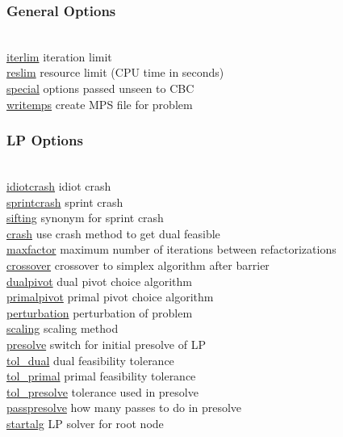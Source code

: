 
\subsubsection{General Options}
\begin{tabbing}
\hspace {1.3in} \= \\
\hyperlink{iterlim}
{iterlim} \> iteration limit \\
\hyperlink{reslim}
{reslim} \> resource limit (CPU time in seconds)\\
\hyperlink{special}
{special} \> options passed unseen to CBC \\
\hyperlink{writemps}
{writemps} \> create MPS file for problem
\end{tabbing}

\subsubsection{LP Options}
\begin{tabbing}
\hspace {1.3in} \= \\
\hyperlink{idiotcrash}
{idiotcrash} \> idiot crash \\
\hyperlink{sprintcrash}
{sprintcrash} \> sprint crash \\
\hyperlink{sifting}
{sifting} \> synonym for sprint crash \\
\hyperlink{crash}
{crash} \> use crash method to get dual feasible \\
\hyperlink{maxfactor}
{maxfactor} \> maximum number of iterations between refactorizations \\
\hyperlink{crossover}
{crossover} \> crossover to simplex algorithm after barrier \\
\hyperlink{dualpivot}
{dualpivot} \> dual pivot choice algorithm \\
\hyperlink{primalpivot}
{primalpivot} \> primal pivot choice algorithm \\
\hyperlink{perturbation}
{perturbation} \> perturbation of problem \\
\hyperlink{scaling}
{scaling} \> scaling method \\
\hyperlink{presolve}
{presolve} \> switch for initial presolve of LP \\
\hyperlink{tol_dual}
{tol\_dual} \> dual feasibility tolerance \\
\hyperlink{tol_primal}
{tol\_primal} \> primal feasibility tolerance \\
\hyperlink{tol_presolve}
{tol\_presolve} \> tolerance used in presolve \\
\hyperlink{passpresolve}
{passpresolve} \> how many passes to do in presolve \\
\hyperlink{startalg}
{startalg} \> LP solver for root node
\end{tabbing}


